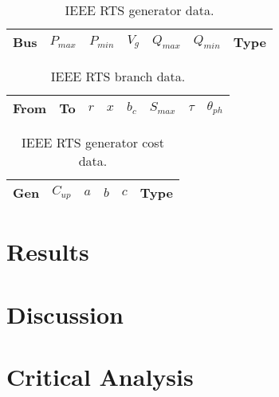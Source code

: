 \begin{table}
\begin{center}
\begin{tabular}{c|c|c|c|c|c|c}
\hline
Bus &$P_{max}$ &$P_{min}$ &$V_g$ &$Q_{max}$ &$Q_{min}$ &Type\\
\hline\hline

\hline
\end{tabular}
\caption{IEEE RTS generator data.}
\label{tbl:rtsgen}
\end{center}
\end{table}

\begin{table}
\begin{center}
\begin{tabular}{c|c|c|c|c|c|c|c}
\hline
From &To &$r$ &$x$ &$b_c$ &$S_{max}$ &$\tau$ &$\theta_{ph}$\\
\hline\hline

\hline
\end{tabular}
\caption{IEEE RTS branch data.}
\label{tbl:rtsbranch}
\end{center}
\end{table}

\begin{table}
\begin{center}
\begin{tabular}{c|c|c|c|c|c}
\hline
Gen &$C_{up}$ &$a$ &$b$ &$c$ &Type\\
\hline\hline

\hline
\end{tabular}
\caption{IEEE RTS generator cost data.}
\label{tbl:rtsgencost}
\end{center}
\end{table}

\section{Results}
\section{Discussion}
\label{sec:discuss}
\section{Critical Analysis}
